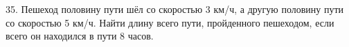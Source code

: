 35. Пешеход половину пути шёл со скоростью 3 км/ч, а другую половину пути со скоростью 5 км/ч. Найти длину всего пути, пройденного пешеходом, если всего он находился в пути 8 часов.\\
